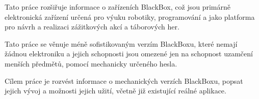 Tato práce rozšiřuje informace o zařízeních BlackBox, což jsou primárně elektronická zařízení určená pro 
výuku robotiky, programování a jako platforma pro návrh a realizaci zážitkových akcí a táborových her.

Tato práce se věnuje méně sofistikovaným verzím BlackBoxu, které nemají žádnou elektroniku 
a jejich schopnosti jsou omezené jen na schopnost uzamčení menších předmětů, pomocí mechanicky určeného hesla.

Cílem práce je rozvést informace o mechanických verzích BlackBoxu, popsat jejich vývoj a možnosti jejich užití, 
včetně již existující reálné aplikace.
